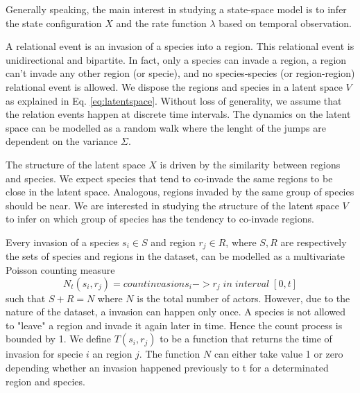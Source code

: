 \documentclass[mscthesis]{usiinfthesis}
\begin{document}
Generally speaking, the main interest in studying a state-space model is to infer the state configuration $X$ and the rate function $\lambda$ based on temporal observation.


A relational event is an invasion of a species into a region. This relational event is unidirectional and bipartite. In fact, only a species can invade a region, a region can't invade any other region (or specie), and no species-species (or region-region) relational event is allowed. We dispose the regions and species in a latent space $V$ as explained in Eq. \ref{eq:latentspace}. Without loss of generality, we assume that the relation events happen at discrete time intervals. The dynamics on the latent space can be modelled as a random walk where the lenght of the jumps are dependent on the variance $\Sigma$.



The structure of the latent space $X$ is driven by the similarity between regions and species. We expect species that tend to co-invade the same regions to be close in the latent space. Analogous, regions invaded by the same group of species should be near. We are interested in studying the structure of the latent space $V$ to infer on which group of species has the tendency to co-invade regions.


Every invasion of a species $s_i \in S$ and region $r_j \in R$, where $S, R$ are respectively the sets of species and regions in the dataset, can be modelled as a multivariate Poisson counting measure $$N_t(s_i, r_j) = count{invasion s_i -> r_j \; in \; interval \; [0, t]}$$ such that $S+R = N$ where $N$ is the total number of actors. However, due to the nature of the dataset, a invasion can happen only once. A species is not allowed to "leave" a region and invade it again later in time. Hence the count process is bounded by 1. We define $T(s_i, r_j)$ to be a function that returns the time of invasion for specie $i$ an region $j$. The function $N$ can either take value 1 or zero depending whether an invasion happened previously to t for a determinated region and species.
\end{document}
